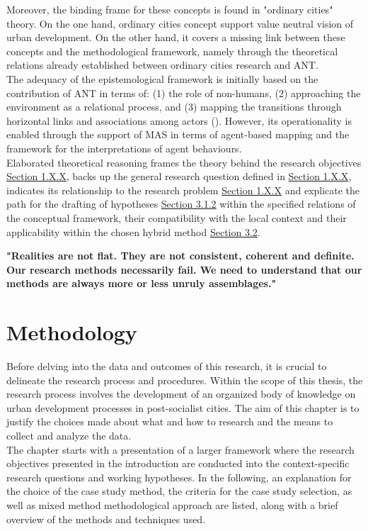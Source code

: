 \documentclass[11pt]{report}
\begin{document}
Moreover, the binding frame for these concepts is found in "ordinary cities" theory. On the one hand, ordinary cities concept support value neutral vision of urban development. On the other hand, it covers a missing link between these concepts and the methodological framework, namely through the theoretical relations already established between ordinary cities research and ANT.
\\

The adequacy of the epistemological framework is initially based on the contribution of ANT in terms of:
(1) the role of non-humans,
(2) approaching the environment as a relational process, and
(3) mapping the transitions through horizontal links and associations among actors (\cite{Latour 2005}).
However, its operationality is enabled through the support of MAS in terms of agent-based mapping and the framework for the interpretations of agent behaviours. 
\\

Elaborated theoretical reasoning frames the theory behind the research objectives \href{Section 1.X.X}{Section 1.X.X}, backs up the general research question defined in \href{Section 1.X.X}{Section 1.X.X}, indicates its relationship to the research problem \href{Section 1.X.X}{Section 1.X.X} and explicate the path for the drafting of hypotheses \href{Section 3.1.2}{Section 3.1.2} within the specified relations of the conceptual framework, their compatibility with the local context and their applicability within the chosen hybrid method \href{Section 3.2}{Section 3.2}.

\textbf{"Realities are not flat. They are not consistent, coherent and definite. Our research methods necessarily fail. We need to understand that our methods are always more or less unruly assemblages." \citealt{Law 2007}}



\chapter{Methodology}

Before delving into the data  and outcomes of this research, it is crucial to delineate the research process and procedures. Within the scope of this thesis, the research process involves the development of an organized body of knowledge on urban development processes in post-socialist cities. The aim of this chapter is to justify the choices made about what and how to research and the means to collect and analyze the data.
\\
The chapter starts with a presentation of a larger framework where the research objectives presented in the introduction are conducted into the context-specific research questions and working hypotheses. In the following, an explanation for the choice of the case study method, the criteria for the case study selection, as well as mixed method methodological approach are listed, along with a brief overview of the methods and techniques used.  
\end{document}
